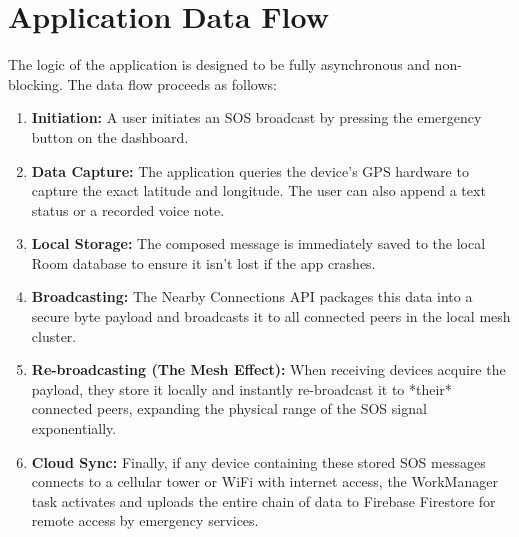 \section{Application Data Flow}
The logic of the application is designed to be fully asynchronous and non-blocking. The data flow proceeds as follows:
\begin{enumerate}
    \item \textbf{Initiation:} A user initiates an SOS broadcast by pressing the emergency button on the dashboard.
    \item \textbf{Data Capture:} The application queries the device's GPS hardware to capture the exact latitude and longitude. The user can also append a text status or a recorded voice note.
    \item \textbf{Local Storage:} The composed message is immediately saved to the local Room database to ensure it isn't lost if the app crashes.
    \item \textbf{Broadcasting:} The Nearby Connections API packages this data into a secure byte payload and broadcasts it to all connected peers in the local mesh cluster.
    \item \textbf{Re-broadcasting (The Mesh Effect):} When receiving devices acquire the payload, they store it locally and instantly re-broadcast it to *their* connected peers, expanding the physical range of the SOS signal exponentially.
    \item \textbf{Cloud Sync:} Finally, if any device containing these stored SOS messages connects to a cellular tower or WiFi with internet access, the WorkManager task activates and uploads the entire chain of data to Firebase Firestore for remote access by emergency services.
\end{enumerate}